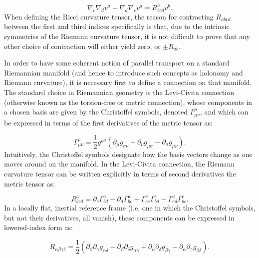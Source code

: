 \documentclass{article}
\begin{document}
\begin{equation}
\nabla_c \nabla_d v^a - \nabla_d \nabla_c v^a = R_{b c d}^{a} v^b.
\end{equation}
When defining the Ricci curvature tensor, the reason for contracting ${R_{a b c d}}$ between the first and third indices specifically is that, due to the intrinsic symmetries of the Riemann curvature tensor, it is not difficult to prove that any other choice of contraction will either yield zero, or ${\pm R_{a b}}$.

In order to have some coherent notion of parallel transport on a standard Riemannian manifold (and hence to introduce such concepts as holonomy and Riemann curvature), it is necessary first to define a connection on that manifold. The standard choice in Riemannian geometry is the Levi-Civita connection (otherwise known as the torsion-free or metric connection), whose components in a chosen basis are given by the Christoffel symbols, denoted ${\Gamma_{\mu \nu}^{\rho}}$, and which can be expressed in terms of the first derivatives of the metric tensor as:

\begin{equation}
\Gamma_{\mu \nu}^{\rho} = \frac{1}{2} g^{\rho \sigma} \left( \partial_{\mu} g_{\sigma \nu} + \partial_{\nu} g_{\mu \sigma} - \partial_{\sigma} g_{\mu \nu} \right).
\end{equation}
Intuitively, the Christoffel symbols designate how the basis vectors change as one moves around on the manifold. In the Levi-Civita connection, the Riemann curvature tensor can be written explicitly in terms of second derivatives the metric tensor as:

\begin{equation}
R_{b c d}^{a} = \partial_c \Gamma_{b d}^{a} - \partial_d \Gamma_{b c}^{a} + \Gamma_{e c}^{a} \Gamma_{b d}^{e} - \Gamma_{e d}^{a} \Gamma_{b c}^{e}.
\end{equation}
In a locally flat, inertial reference frame (i.e. one in which the Christoffel symbols, but not their derivatives, all vanish), these components can be expressed in lowered-index form as:

\begin{equation}
R_{\alpha \beta \gamma \delta} = \frac{1}{2} \left( \partial_{\beta} \partial_{\gamma} g_{\alpha \delta} - \partial_{\beta} \partial_{\delta} g_{\alpha \gamma} + \partial_{\alpha} \partial_{\delta} g_{\beta \gamma} - \partial_{\alpha} \partial_{\gamma} g_{\beta \delta} \right).
\end{equation}
\end{document}

